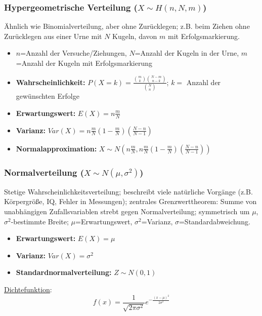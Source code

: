 \subsubsection{Hypergeometrische Verteilung (\(X\sim H(n,N,m)\))}

Ähnlich wie Binomialverteilung, aber ohne Zurücklegen; z.B. beim Ziehen ohne Zurücklegen aus einer Urne mit \(N\) Kugeln, davon \(m\) mit Erfolgsmarkierung.

\begin{itemize}
    \item \(n\)=Anzahl der Versuche/Ziehungen, \(N\)=Anzahl der Kugeln in der Urne, \(m\)=Anzahl der Kugeln mit Erfolgsmarkierung
    \item \textbf{Wahrscheinlichkeit:} \(P(X=k)=\frac{\binom{m}{k}\binom{N-m}{n-k}}{\binom{N}{n}}\); \(k=\) Anzahl der gewünschten Erfolge
    \item \textbf{Erwartungswert:} \(E(X)=n\frac{m}{N}\)
    \item \textbf{Varianz:} \(Var(X)=n\frac{m}{N}\left(1-\frac{m}{N}\right)\left(\frac{N-n}{N-1}\right)\)
    \item \textbf{Normalapproximation:} \(X\sim N\left(n\frac{m}{N}, n\frac{m}{N}\left(1-\frac{m}{N}\right)\left(\frac{N-n}{N-1}\right)\right)\)
\end{itemize}


\subsubsection{Normalverteilung (\(X\sim N(\mu, \sigma^2)\))}
Stetige Wahrscheinlichkeitsverteilung; beschreibt viele natürliche Vorgänge (z.B. Körpergröße, IQ, Fehler in Messungen); zentrales Grenzwerttheorem: Summe von unabhängigen Zufallsvariablen strebt gegen Normalverteilung; symmetrisch um \(\mu\), \(\sigma^2\)-bestimmte Breite; \(\mu\)=Erwartungswert, \(\sigma^2\)=Varianz, \(\sigma\)=Standardabweichung.\\

\begin{minipage}{0.5\textwidth}
    \begin{itemize}
        \item \textbf{Erwartungswert:} \(E(X)=\mu\)
        \item \textbf{Varianz:} \(Var(X)=\sigma^2\)
        \item \textbf{Standardnormalverteilung:} \(Z\sim N(0,1)\)
    \end{itemize}
\end{minipage}
\begin{minipage}{0.2\textwidth}
    \underline{Dichtefunktion}:
    \begin{equation*}
        f(x)=\frac{1}{\sqrt{2\pi\sigma^2}}e^{-\frac{(x-\mu)^2}{2\sigma^2}}
    \end{equation*}
\end{minipage}